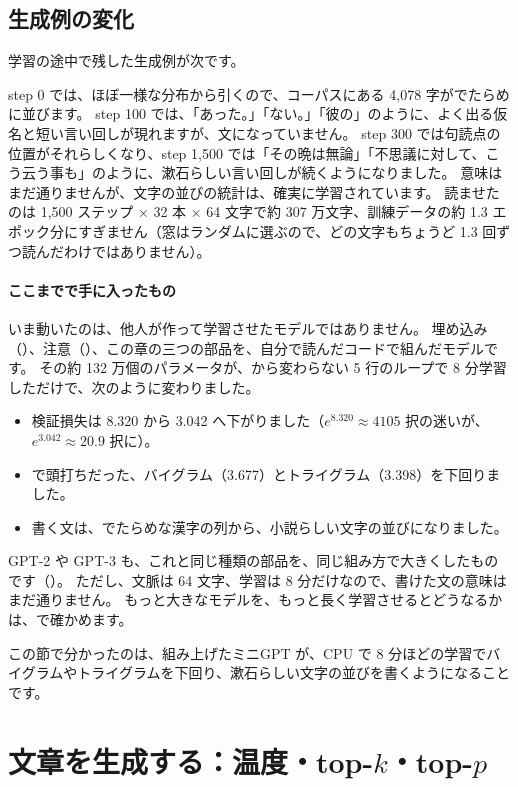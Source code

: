 \subsection*{生成例の変化}

学習の途中で残した生成例が次です。


step 0 では、ほぼ一様な分布から引くので、コーパスにある 4,078 字がでたらめに並びます。
step 100 では、「あった。」「ない。」「彼の」のように、よく出る仮名と短い言い回しが現れますが、文になっていません。
step 300 では句読点の位置がそれらしくなり、step 1,500 では「その晩は無論」「不思議に対して、こう云う事も」のように、漱石らしい言い回しが続くようになりました。
意味はまだ通りませんが、文字の並びの統計は、確実に学習されています。
読ませたのは 1,500 ステップ × 32 本 × 64 文字で約 307 万文字、訓練データの約 1.3 エポック分にすぎません（窓はランダムに選ぶので、どの文字もちょうど 1.3 回ずつ読んだわけではありません）。

\paragraph{ここまでで手に入ったもの}
いま動いたのは、他人が作って学習させたモデルではありません。
埋め込み（）、注意（）、この章の三つの部品を、自分で読んだコードで組んだモデルです。
その約 132 万個のパラメータが、から変わらない 5 行のループで 8 分学習しただけで、次のように変わりました。
\begin{itemize}
\item 検証損失は 8.320 から 3.042 へ下がりました（$e^{8.320}\approx4105$ 択の迷いが、$e^{3.042}\approx20.9$ 択に）。
\item {}で頭打ちだった、バイグラム（3.677）とトライグラム（3.398）を下回りました。
\item 書く文は、でたらめな漢字の列から、小説らしい文字の並びになりました。
\end{itemize}
GPT-2 や GPT-3 も、これと同じ種類の部品を、同じ組み方で大きくしたものです（）。
ただし、文脈は 64 文字、学習は 8 分だけなので、書けた文の意味はまだ通りません。
もっと大きなモデルを、もっと長く学習させるとどうなるかは、で確かめます。

この節で分かったのは、組み上げたミニGPT が、CPU で 8 分ほどの学習でバイグラムやトライグラムを下回り、漱石らしい文字の並びを書くようになることです。

\section{文章を生成する：温度・top-\texorpdfstring{$k$}{k}・top-\texorpdfstring{$p$}{p}}\label{sec:tf-generate}

